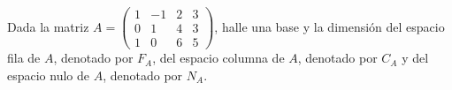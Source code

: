 \item Dada la matriz 
    \(
        A = \left(\begin{smallmatrix}
            1 & -1 & 2 & 3 \\
            0 & 1 & 4 & 3 \\
            1 & 0 & 6 & 5
        \end{smallmatrix}\right)
    \),
    halle una base y la dimensión del espacio fila de \(A\), denotado por \(F_A\), del espacio columna de \(A\), denotado por \(C_A\) y del espacio nulo de \(A\), denotado por \(N_A\).
